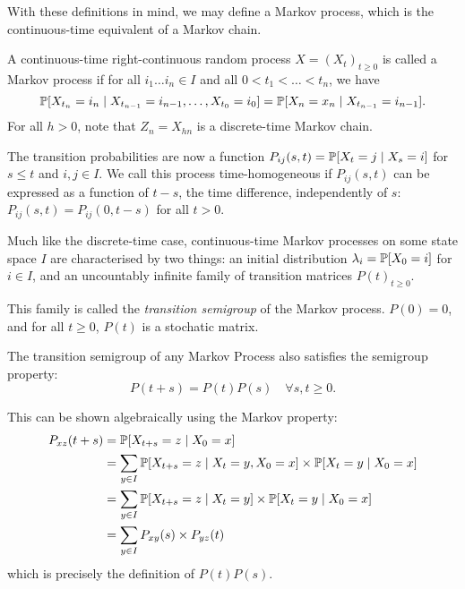 \documentclass{article}
\begin{document}
With these definitions in mind, we may define a Markov process, which is the continuous-time equivalent of a Markov chain.

\begin{definition}
    A continuous-time right-continuous random process $X = (X_t)_{t \geq 0}$ is called a Markov process if for all $i_1 \dots i_n \in I$ and all $0 < t_1 < \dots < t_n$, we have
	\[
	\P[X_{t_n} = i_n \mid X_{t_{n-1}} = i_{n-1}, \dots, X_{t_0} = i_0] = \P[X_n = x_n \mid X_{t_{n-1}} = i_{n-1}].
	\]
	For all $h > 0$, note that $Z_n = X_{h n}$ is a discrete-time Markov chain.
	
	The transition probabilities are now a function $P_{ij}(s, t) = \P[X_t = j \mid X_s = i]$ for $s \leq t$ and $i, j \in I$. We call this process time-homogeneous if $P_{ij}(s, t)$ can be expressed as a function of $t-s$, the time difference, independently of $s$: $P_{ij}(s, t) = P_{ij}(0, t-s)$ for all $t > 0$.
\end{definition}


Much like the discrete-time case, continuous-time Markov processes on some state space $I$ are characterised by two things: an initial distribution $\lambda_i = \P[X_0 = i]$ for $i \in I$, and an uncountably infinite family of transition matrices $P(t)_{t \geq 0}$.

This family is called the \textit{transition semigroup} of the Markov process. $P(0) = 0$, and for all $t \geq 0$, $P(t)$ is a stochatic matrix.
\begin{proposition}
	The transition semigroup of any Markov Process also satisfies the semigroup property:
	\[
		P(t+s) = P(t)P(s) \quad \forall s, t \geq 0.
	\]
\end{proposition}
\begin{prf}
	This can be shown algebraically using the Markov property:
	\begin{align*}
    	P_{xz}(t+s) &= \P[X_{t+s} = z \mid X_0 = x] \\
	    &= \sum_{y \in I} \P[X_{t+s} = z \mid X_t = y, X_0 = x] \times \P[X_t = y \mid X_0 = x] \\
    	&= \sum_{y \in I} \P[X_{t+s} = z \mid X_t = y] \times \P[X_t = y \mid X_0 = x] \\
	    &= \sum_{y \in I} P_{xy}(s) \times P_{yz}(t)
	\end{align*}
	which is precisely the definition of $P(t)P(s)$.
\end{prf}

\end{document}
